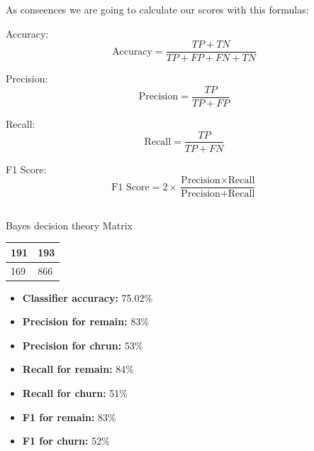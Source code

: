 \documentclass[12pt]{article}
\begin{document}
\newpage
As conseences we are going to calculate our scores with this formulas:\\
\vspace{\baselineskip}

Accuracy:
\[
\text{Accuracy} = \frac{TP + TN}{TP + FP + FN + TN}
\]

Precision:
\[
\text{Precision} = \frac{TP}{TP + FP}
\]

Recall:
\[
\text{Recall} = \frac{TP}{TP + FN}
\]

F1 Score:
\[
\text{F1 Score} = 2 \times \frac{\text{Precision} \times \text{Recall}}{\text{Precision} + \text{Recall}}
\]

\vspace{\baselineskip}

\subsection{}{Bayes decision theory Matrix}
\begin{table}[ht]
  \large
  \centering
\begin{tabular}{|l|l|}
  \hline
  191 & 193\\
  \hline
  169 & 866\\
  \hline
\end{tabular}
\end{table}
\begin{itemize}
  \item \textbf{Classifier accuracy:} 75.02\%
  \item \textbf{Precision for remain:} 83\%
  \item \textbf{Precision for chrun:} 53\%
  \item \textbf{Recall for remain:} 84\%
  \item \textbf{Recall for churn:} 51\%
  \item \textbf{F1 for remain:} 83\%
  \item \textbf{F1 for churn:} 52\%
\end{itemize}

\newpage
\end{document}
